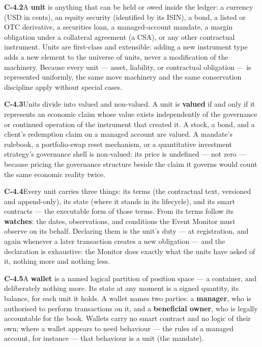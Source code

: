 \documentclass[11pt,a4paper]{article}
\newcommand{\clause}[2]{\par\medskip\noindent\textbf{#1}\hspace{0.6em}#2}
\begin{document}
\clause{C-4.2}{A \textbf{unit} is anything that can be held or owed inside the
ledger: a currency (USD in cents), an equity security (identified by its ISIN), a
bond, a listed or OTC derivative, a securities loan, a managed-account mandate, a
margin obligation under a collateral agreement (a CSA), or any other contractual
instrument. Units are first-class and extensible: adding a new instrument type
adds a new element to the universe of units, never a modification of the
machinery. Because every unit --- asset, liability, or contractual obligation ---
is represented uniformly, the same move machinery and the same conservation
discipline apply without special cases.}

\clause{C-4.3}{Units divide into valued and non-valued. A unit is \textbf{valued}
if and only if it represents an economic claim whose value exists independently of
the governance or continued operation of the instrument that created it. A stock,
a bond, and a client's redemption claim on a managed account are valued. A
mandate's rulebook, a portfolio-swap reset mechanism, or a quantitative investment
strategy's governance shell is non-valued: its price is undefined --- not zero ---
because pricing the governance structure beside the claim it governs would count
the same economic reality twice.}

\clause{C-4.4}{Every unit carries three things: its terms (the contractual text,
versioned and append-only), its state (where it stands in its lifecycle), and its
smart contracts --- the executable form of those terms. From its terms follow its
\textbf{watches}: the dates, observations, and conditions the Event Monitor must
observe on its behalf. Declaring them is the unit's duty --- at registration, and
again whenever a later transaction creates a new obligation --- and the
declaration is exhaustive: the Monitor does exactly what the units have asked of
it, nothing more and nothing less.}

\clause{C-4.5}{A \textbf{wallet} is a named logical partition of position space ---
a container, and deliberately nothing more. Its state at any moment is a signed
quantity, its balance, for each unit it holds. A wallet names two parties: a
\textbf{manager}, who is authorised to perform transactions on it, and a
\textbf{beneficial owner}, who is legally accountable for the book. Wallets carry
no smart contract and no logic of their own; where a wallet appears to need
behaviour --- the rules of a managed account, for instance --- that behaviour is a
unit (the mandate).}
\end{document}
